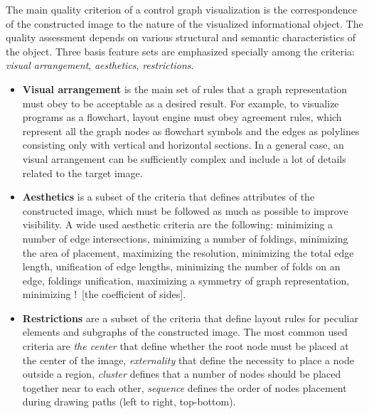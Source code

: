 \documentclass[conference]{IEEEtran}
\newcommand{\nnn}[2][ncolor]{\noindent%
\textcolor{eclr}{!\ [}\textcolor{#1}{#2}\textcolor{eclr}{]}}
\begin{document}
The main quality criterion of a control graph visualization is the correspondence of the constructed image to the nature of the visualized informational object.  The quality assessment depends on various structural and semantic characteristics of the object.  Three basis feature sets are emphasized specially among the criteria: \emph{visual arrangement}, \emph{aesthetics}, \emph{restrictions}.
\begin{itemize}
\item \textbf{Visual arrangement} is the main set of rules that a graph representation must obey to be acceptable as a desired result.  For example, to visualize programs as a flowchart, layout engine must obey agreement rules, which represent all the graph nodes as flowchart symbols and the edges as polylines consisting only with vertical and horizontal sections.  In a general case, an visual arrangement can be sufficiently complex and include a lot of details related to the target image.
\item \textbf{Aesthetics} is a subset of the criteria that defines attributes of the constructed image, which must be followed as much as possible to improve visibility.  A wide used aesthetic criteria are the following: minimizing a number of edge intersections, minimizing a number of foldings, minimizing the area of placement, maximizing the resolution, minimizing the total edge length, unification of edge lengths, minimizing the number of folds on an edge, foldings unification, maximizing a symmetry of graph representation, minimizing \nnn{the coefficient of sides}. %
\item \textbf{Restrictions} are a subset of the criteria that define layout rules for peculiar elements and subgraphs of the constructed image.  The most common used criteria are \emph{the center} that define whether the root node must be placed at the center of the image, \emph{externality} that define the necessity to place a node outside a region, \emph{cluster} defines that a number of nodes should be placed together near to each other, \emph{sequence} defines the order of nodes placement during drawing paths (left to right, top-bottom).
\end{itemize}
\end{document}
